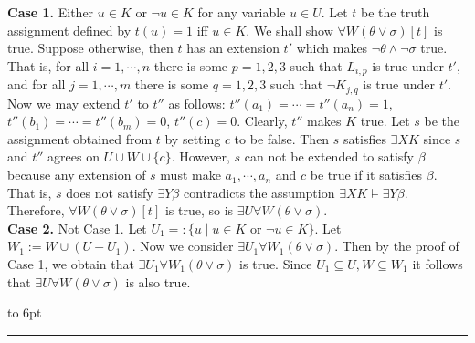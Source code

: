 \documentclass[12pt]{article}
\newenvironment{proof}{\parindent=0pt{\bf Proof: }}{
   \hspace*{\fill}\hbox to 6pt{\leaders\hrule width 6pt height 6pt\hfill}\par}
\begin{document}
\begin{proof}
{\bf Case 1.} Either $u\in K$ or $\neg u\in K$ for any variable $u\in U$. Let $t$ be the truth assignment defined by $t(u)=1$ iff $u\in K$. We shall show $\forall W(\theta\vee \sigma)[t]$ is true. Suppose otherwise, then $t$ has an extension $t'$ which makes $\neg\theta \wedge \neg \sigma$ true.
That is, for all $i=1,\cdots, n$ there is some $p=1,2,3$ such that $L_{i,p}$ is true under $t'$, and for all $j=1,\cdots,m$ there is some $q=1,2,3$ such that $\neg K_{j,q}$ is true under $t'$. Now we may extend $t'$ to $t''$ as follows: $t''(a_1)=\cdots=t''(a_n)=1$, $t''(b_1)=\cdots=t''(b_m)=0$, $t''(c)=0$. Clearly, $t''$ makes $K$ true. Let $s$ be the assignment obtained from $t$ by setting $c$ to be false. Then $s$ satisfies $\exists X K$ since $s$ and $t''$ agrees on $U\cup W\cup\{c\}$. However, $s$ can not be extended to satisfy $\beta$ because any extension of $s$ must make $a_1,\cdots, a_n$ and $c$ be true if it satisfies $\beta$. That is, $s$ does not satisfy $\exists Y\beta$ contradicts the assumption $\exists X K\models\exists Y\beta$.
Therefore, $\forall W(\theta\vee \sigma)[t]$ is true, so is $\exists U\forall W(\theta\vee \sigma)$.\\

{\bf Case 2.} Not Case 1. Let $U_1=:\{u\mid u\in K \mbox{ or }\neg u\in K\}$. Let $W_1:=W\cup (U-U_1)$. Now we consider $\exists U_1\forall W_1(\theta\vee\sigma)$. Then by the proof of Case 1, we obtain that $\exists U_1\forall W_1(\theta\vee\sigma)$ is true. Since $U_1\subseteq U, W\subseteq W_1$ it follows that $\exists U\forall W(\theta\vee\sigma)$ is also true.

\color{black}

\end{proof}



\vspace*{3mm}
\end{document}
